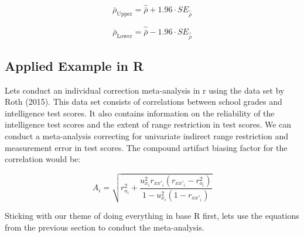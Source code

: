 \documentclass[
  letterpaper,
  DIV=11,
  numbers=noendperiod]{scrreprt}
\begin{document}
\[
\bar{\rho}_\text{Upper} = \hat{\bar{\rho}} + 1.96\cdot SE_{\hat{\bar{\rho}}}
\]

\[
\bar{\rho}_\text{Lower} = \hat{\bar{\rho}} - 1.96\cdot SE_{\hat{\bar{\rho}}}
\]

\subsection{Applied Example in R}\label{applied-example-in-r-16}

Lets conduct an individual correction meta-analysis in r using the data
set by Roth (2015). This data set consists of correlations between
school grades and intelligence test scores. It also contains information
on the reliability of the intelligence test scores and the extent of
range restriction in test scores. We can conduct a meta-analysis
correcting for univariate indirect range restriction and measurement
error in test scores. The compound artifact biasing factor for the
correlation would be:

\[
A_i=\sqrt{r_{o_i}^2 + \frac{u_{x_i}^2 r_{xx'_i}(r_{xx'_i} - r_{o_i}^2) }{1 - u_{x_i}^2 (1-r_{xx'_i})} }
\]

Sticking with our theme of doing everything in base R first, lets use
the equations from the previous section to conduct the meta-analysis.
\end{document}
